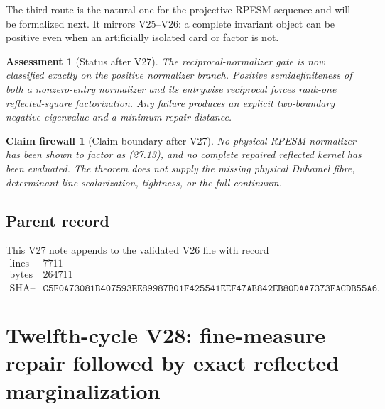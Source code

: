 \documentclass[11pt]{article}
\newtheorem{firewall}[theorem]{Claim firewall}
\newtheorem{assessment}[theorem]{Assessment}
\theoremstyle{remark}
\begin{document}
The third route is the natural one for the projective RPESM sequence
and will be formalized next.  It mirrors V25--V26: a complete
invariant object can be positive even when an artificially isolated
card or factor is not.

\begin{assessment}[Status after V27]
\label{ass:v12v27-status}
The reciprocal-normalizer gate is now classified exactly on the
positive normalizer branch.  Positive semidefiniteness of both a
nonzero-entry normalizer and its entrywise reciprocal forces rank-one
reflected-square factorization.  Any failure produces an explicit
two-boundary negative eigenvalue and a minimum repair distance.
\end{assessment}

\begin{firewall}[Claim boundary after V27]
\label{fire:v12v27-claim}
No physical RPESM normalizer has been shown to factor as (27.13), and
no complete repaired reflected kernel has been evaluated.  The
theorem does not supply the missing physical Duhamel fibre,
determinant-line scalarization, tightness, or the full continuum.
\end{firewall}

\subsection{Parent record}

This V27 note appends to the validated V26 file with record
\[
\begin{array}{c|c}
\text{lines}&7711\\
\text{bytes}&264711\\
\text{SHA--256}&
\texttt{C5F0A73081B407593EE89987B01F425541EEF47AB842EB80DAA7373FACDB55A6}.
\end{array}
\]


\section{Twelfth-cycle V28: fine-measure repair followed by exact
reflected marginalization}
\label{sec:v12v28}
\end{document}
